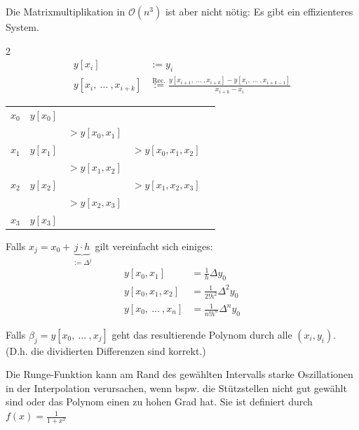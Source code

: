 Die Matrixmultiplikation in $\mathcal{O}(n^3)$ ist aber nicht nötig: Es gibt ein effizienteres System. 

\begin{multicols}{2}
    \begin{align*}
        y[x_i] &:= y_i \\
        y[x_i,\ \ldots\ ,x_{i+k}] &\overset{\text{Rec.}}{:=} \frac{y[x_{i+1},\ \ldots\ , x_{i+k}] - y[x_i,\ \ldots\ , x_{i+k-1}]}{x_{i+k}-x_i}
    \end{align*}

    \newcolumn

    \begin{center}
    \begin{tabular}{l|llll}
        $x_0$ & $y[x_0]$ \\
            &          & $>y[x_0,x_1]$        \\
        $x_1$ & $y[x_1]$ &  & $>y[x_0,x_1,x_2]$ \\ 
            &          & $>y[x_1,x_2]$        \\
        $x_2$ & $y[x_2]$ &  & $>y[x_1,x_2,x_3]$ \\
            &          & $>y[x_2,x_3]$        \\
        $x_3$ & $y[x_3]$                        \\
    \end{tabular}
    \end{center}
\end{multicols}


Falls $x_j = x_0 + \underbrace{j \cdot h}_{:= \Delta^j}$ gilt vereinfacht sich einiges:
\begin{align*}
    y[x_0,x_1] &= \frac{1}{h}\Delta y_0 \\
    y[x_0,x_1,x_2] &= \frac{1}{2!h^2} \Delta^2 y_0 \\
    y[x_0,\ \ldots\ , x_n] &= \frac{1}{n! h^n} \Delta^n y_0 
\end{align*}

 Falls $\beta_j = y[x_0,\ \ldots\ , x_j]$ geht das resultierende Polynom durch alle $(x_i,y_i)$.\\
\footnotesize
(D.h. die dividierten Differenzen sind korrekt.)
\normalsize

 Die Runge-Funktion kann am Rand des gewählten Intervalls starke Oszillationen in der Interpolation verursachen, 
wenn bspw. die Stützstellen nicht gut gewählt sind oder das Polynom einen zu hohen Grad hat.
Sie ist definiert durch $\displaystyle f(x) = \frac{1}{1 + x^2}$

